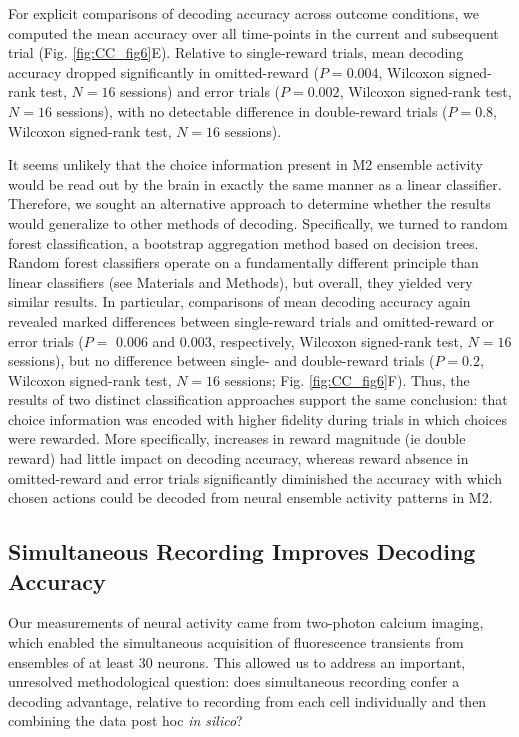 

For explicit comparisons of decoding accuracy across outcome conditions, we computed the mean accuracy over all time-points in the current and subsequent trial (Fig. \ref{fig:CC_fig6}E). Relative to single-reward trials, mean decoding accuracy dropped significantly in omitted-reward ($P = 0.004$, Wilcoxon signed-rank test, $N = 16$ sessions) and error trials ($P = 0.002$, Wilcoxon signed-rank test, $N = 16$ sessions), with no detectable difference in double-reward trials ($P = 0.8$, Wilcoxon signed-rank test, $N = 16$ sessions).

It seems unlikely that the choice information present in M2 ensemble activity would be read out by the brain in exactly the same manner as a linear classifier. Therefore, we sought an alternative approach to determine whether the results would generalize to other methods of decoding. Specifically, we turned to random forest classification, a bootstrap aggregation method based on decision trees. Random forest classifiers operate on a fundamentally different principle than linear classifiers (see Materials and Methods), but overall, they yielded very similar results. In particular, comparisons of mean decoding accuracy again revealed marked differences between single-reward trials and omitted-reward or error trials ($P =$ 0.006 and 0.003, respectively, Wilcoxon signed-rank test, $N = 16$ sessions), but no difference between single- and double-reward trials ($P = 0.2$, Wilcoxon signed-rank test, $N = 16$ sessions; Fig. \ref{fig:CC_fig6}F). Thus, the results of two distinct classification approaches support the same conclusion: that choice information was encoded with higher fidelity during trials in which choices were rewarded. More specifically, increases in reward magnitude (ie double reward) had little impact on decoding accuracy, whereas reward absence in omitted-reward and error trials significantly diminished the accuracy with which chosen actions could be decoded from neural ensemble activity patterns in M2.

\subsection{Simultaneous Recording Improves Decoding Accuracy}
Our measurements of neural activity came from two-photon calcium imaging, which enabled the simultaneous acquisition of fluorescence transients from ensembles of at least 30 neurons. This allowed us to address an important, unresolved methodological question: does simultaneous recording confer a decoding advantage, relative to recording from each cell individually and then combining the data post hoc \textit{in silico}?

